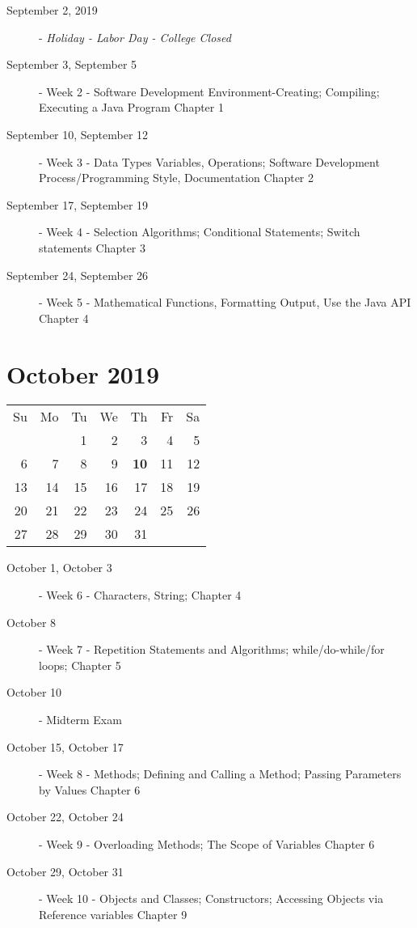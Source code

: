 \documentclass{article}
\begin{document}
\begin{description}
    \item[September 2, 2019] - {\em Holiday - Labor Day - College Closed}
    \item[September 3, September 5] - Week 2 - Software Development
        Environment-Creating; Compiling; Executing a Java Program
        \newline Chapter 1
    \item[September 10, September 12] - Week 3 - Data Types Variables,
        Operations; Software Development Process/Programming Style,
        Documentation
        \newline Chapter 2
    \item[September 17, September 19] - Week 4 - Selection Algorithms;
        Conditional Statements; Switch statements
        \newline Chapter 3
    \item[September 24, September 26] - Week 5 - Mathematical
        Functions, Formatting Output, Use the Java API
        \newline Chapter 4
\end{description}

\hrulefill

\section*{October 2019}
\begin{tabular}{rrrrrrr}
Su & Mo & Tu & We & Th & Fr & Sa\\
   &    &  1 &  2 &  3 &  4 &  5\\
 6 &  7 &  8 &  9 & {\bf 10} & 11 & 12\\
13 & 14 & 15 & 16 & 17 & 18 & 19\\ 
20 & 21 & 22 & 23 & 24 & 25 & 26\\ 
27 & 28 & 29 & 30 & 31 &    &   \\
\end{tabular}

\begin{description}
    \item[October 1, October 3] - Week 6 - Characters, String;
        \newline Chapter 4
    \item[October 8] - Week 7 - Repetition Statements and
        Algorithms; while/do-while/for loops;
        \newline Chapter 5
    \item[October 10] - Midterm Exam
    \item[October 15, October 17] - Week 8 - Methods; Defining and
        Calling a Method; Passing Parameters by Values
        \newline Chapter 6
    \item[October 22, October 24] - Week 9 - Overloading Methods; The
        Scope of Variables
        \newline Chapter 6
    \item[October 29, October 31] - Week 10 - Objects and Classes;
        Constructors; Accessing Objects via Reference variables
        \newline Chapter 9
\end{description}
\end{document}
